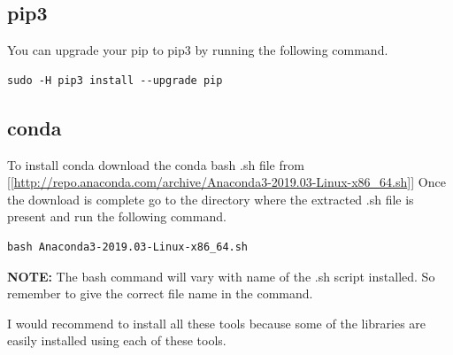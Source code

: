 \documentclass[11pt]{article}
\begin{document}
\subsection*{pip3}
\label{sec-6-2}
You can upgrade your pip to pip3 by running the following command.
\begin{verbatim}
sudo -H pip3 install --upgrade pip
\end{verbatim}
\subsection*{conda}
\label{sec-6-3}
To install conda download the conda bash .sh file from [[\url{http://repo.anaconda.com/archive/Anaconda3-2019.03-Linux-x86_64.sh}]]
Once the download is complete go to the directory where the extracted .sh file is present  
and run the following command.  
\begin{verbatim}
bash Anaconda3-2019.03-Linux-x86_64.sh
\end{verbatim}
\textbf{\textbf{NOTE:}} The bash command will vary with name of the .sh script installed. So remember  
 to give the correct file name in the command. \newline 

I would recommend to install all these tools because some of the libraries are easily  
installed using each of these tools.  
\end{document}
